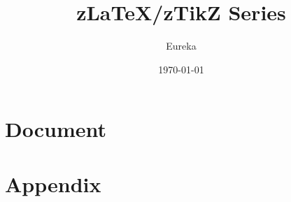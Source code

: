 \documentclass[
    lang=cn, 
    layout=oneside, 
    margin=false, 
    math-alias=true,
    toc={rename, 2column},
]{zlatex}
\title{z\LaTeX{}/zTikZ Series}
\author{Eureka}
\date{\today}
\begin{document}
\maketitle
\frontmatter
\tableofcontents
\mainmatter
\part{Document}


\printindex


\part{Appendix}


\end{document}
